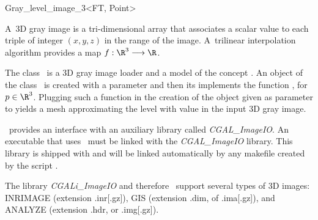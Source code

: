 

\begin{ccRefClass}{Gray_level_image_3<FT, Point>}


\ccDefinition

 A~3D gray image is a
tri-dimensional array that associates a scalar value to each triple of
integer $(x, y, z)$ in the range of the image. A~trilinear interpolation
algorithm provides a map \begin{math}f : \R^3 \longrightarrow \R\end{math}.

The class \ccRefName\ is a 3D gray image loader and a model
of the concept .
An object of the class \ccRefName\  is created with a parameter
 and then its   implements
the function , for $p \in \R^3$.
Plugging such a function in the creation of the 
object given as parameter  to  yields
a mesh approximating the level with value 
in the input 3D gray image.
 


\ccRefName\ provides an interface with an auxiliary library called
\emph{CGAL_ImageIO}. An executable that uses \ccRefName\ must be linked with
the \emph{CGAL_ImageIO} library. This library is shipped with \cgal{} and
will be linked automatically by any makefile created by the script
.

The library \emph{CGALi_ImageIO} and therefore \ccRefName\ support
several types of 3D images: INRIMAGE (extension .inr[.gz]), GIS (extension
.dim, of .ima[.gz]), and ANALYZE (extension .hdr, or .img[.gz]).



\end{ccRefClass}
